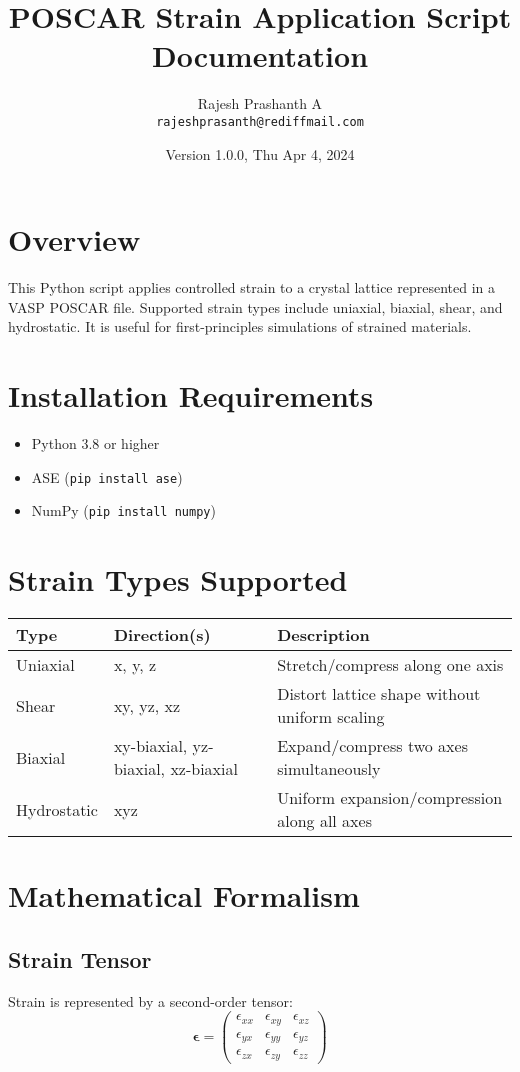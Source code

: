 \documentclass[12pt]{article}
\title{POSCAR Strain Application Script Documentation}
\author{Rajesh Prashanth A \\ \texttt{rajeshprasanth@rediffmail.com}}
\date{Version 1.0.0, Thu Apr 4, 2024}
\begin{document}
\maketitle

\section{Overview}
This Python script applies controlled strain to a crystal lattice represented in a VASP POSCAR file. Supported strain types include uniaxial, biaxial, shear, and hydrostatic. It is useful for first-principles simulations of strained materials.

\section{Installation Requirements}
\begin{itemize}
    \item Python 3.8 or higher
    \item ASE (\texttt{pip install ase})
    \item NumPy (\texttt{pip install numpy})
\end{itemize}

\section{Strain Types Supported}

\begin{tabular}{|l|l|l|}
\hline
\textbf{Type} & \textbf{Direction(s)} & \textbf{Description} \\
\hline
Uniaxial & x, y, z & Stretch/compress along one axis \\
Shear & xy, yz, xz & Distort lattice shape without uniform scaling \\
Biaxial & xy-biaxial, yz-biaxial, xz-biaxial & Expand/compress two axes simultaneously \\
Hydrostatic & xyz & Uniform expansion/compression along all axes \\
\hline
\end{tabular}

\section{Mathematical Formalism}

\subsection{Strain Tensor}
Strain is represented by a second-order tensor:
\[
\boldsymbol{\epsilon} =
\begin{pmatrix}
\epsilon_{xx} & \epsilon_{xy} & \epsilon_{xz} \\
\epsilon_{yx} & \epsilon_{yy} & \epsilon_{yz} \\
\epsilon_{zx} & \epsilon_{zy} & \epsilon_{zz}
\end{pmatrix}
\]
\end{document}
